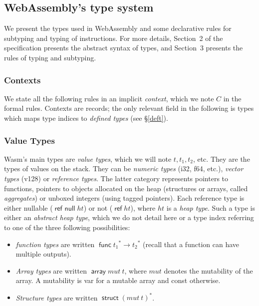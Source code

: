 \documentclass[a4paper,11pt]{article}
\DeclareMathOperator{\reft}{\textsf{ref}}
\DeclareMathOperator{\strt}{\textsf{struct}}
\DeclareMathOperator{\arrt}{\textsf{array}}
\DeclareMathOperator{\funt}{\textsf{func}}
\DeclareMathOperator{\refnullt}{\textsf{ref null}}
\begin{document}
\subsection{WebAssembly's type system}\label{type}
We present the types used in WebAssembly and some declarative rules for
subtyping and typing of instructions. For more details, Section~2 of the
specification presents the abstract syntax of types, and Section~3 presents the
rules of typing and subtyping.
\subsubsection{Contexts}
We state all the following rules in an implicit \emph{context}, which we note
$C$ in the formal rules. Contexts are records; the only relevant field in the
following is \textsf{types} which maps type indices to \emph{defined types}
(see \S\ref{deft}).

\subsubsection{Value Types}
Wasm's main types are \emph{value types}, which we will note $t, t_1, t_2$, etc.
They are the types of values on the stack. They can be \emph{numeric types}
(\textsf{i32}, \textsf{f64}, etc.), \emph{vector types} (\textsf{v128}) or
\emph{reference types}. The latter category represents pointers to functions,
pointers to objects allocated on the heap (structures or arrays, called
\emph{aggregates}) or unboxed integers (using tagged pointers). Each reference
type is either nullable ($\refnullt ht$) or not ($\reft ht$), where $ht$ is a
\emph{heap type}. Such a type is either an \emph{abstract heap type}, which we
do not detail here or a type index referring to one of the three following
possibilities:
\begin{itemize}\setlength{\itemsep}{0pt}
  \item \emph{function types} are written
$\funt{t_1}^*\to{t_2}^*$ (recall that a function can have multiple outputs).
  \item \emph{Array types} are written $\arrt mut\ t$, where $mut$ denotes the
    mutability of the array. A mutability is \textsf{var} for a mutable array
    and \textsf{const} otherwise.
\item \emph{Structure types} are written $\strt {(mut\ t)}^*$.
\end{itemize}
\end{document}
